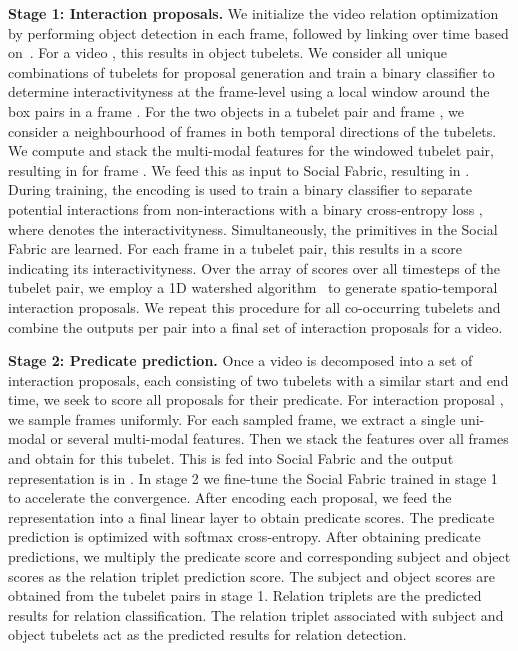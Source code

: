 \documentclass[10pt,twocolumn,letterpaper]{article}
\begin{document}
\textbf{Stage 1: Interaction proposals.}
We initialize the video relation optimization by performing object detection in each frame, followed by linking over time based on~\cite{2017ICIP-DeepSort}. For a video , this results in  object tubelets. We consider all unique combinations of tubelets for proposal generation and train a binary classifier to determine interactivityness at the frame-level using a local window around the box pairs in a frame \cite{chen2020interactivity}.
For the two objects  in a tubelet pair and frame , we consider a neighbourhood of  frames in both temporal directions of the tubelets. We compute and stack the multi-modal features for the windowed tubelet pair, resulting in  for frame . We feed this as input to Social Fabric, resulting in . During training, the encoding is used to train a binary classifier to separate potential interactions from non-interactions with a binary cross-entropy loss , where  denotes the interactivityness.
 Simultaneously, the primitives in the Social Fabric are learned. For each frame in a tubelet pair, this results in a score indicating its interactivityness. Over the array of scores over all timesteps of the tubelet pair, we employ a 1D watershed algorithm~\cite{chen2020interactivity,2000-watershed} to generate spatio-temporal interaction proposals. We repeat this procedure for all co-occurring tubelets and combine the outputs per pair into a final set of interaction proposals for a video.

\textbf{Stage 2: Predicate prediction.}
Once a video is decomposed into a set of interaction proposals, each consisting of two tubelets with a similar start and end time, we seek to score all proposals for their predicate.
For interaction proposal , we sample  frames uniformly.
For each sampled frame, we extract a single uni-modal or several multi-modal features. Then we stack the features over all frames and obtain  for this tubelet. This is fed into Social Fabric and the output representation is in . 
In stage 2 we fine-tune the Social Fabric trained in stage 1 to accelerate the convergence. After encoding each proposal, we feed the representation into a final linear layer to obtain predicate scores. The predicate prediction is optimized with softmax cross-entropy.
After obtaining predicate predictions, we multiply the predicate score and corresponding subject and object scores as the relation triplet prediction score. The subject and object scores are obtained from the tubelet pairs in stage 1. Relation triplets are the predicted results for relation classification. The relation triplet associated with subject and object tubelets act as the predicted results for relation detection.
\end{document}
